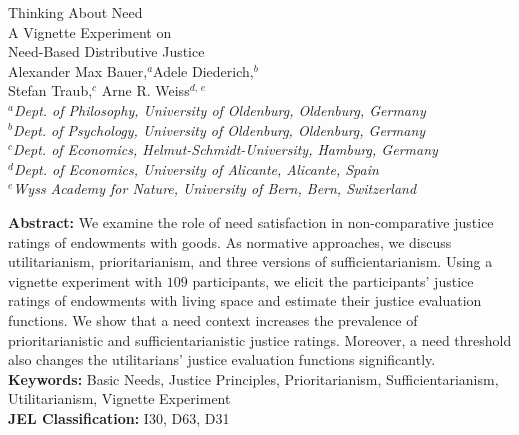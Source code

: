 \documentclass[12pt]{scrartcl}
\begin{document}
\thispagestyle{empty}
\renewcommand{\thefootnote}{\fnsymbol{footnote}}
\begin{center}
{\LARGE Thinking About Need}\\\vspace{2ex}
{\Large A Vignette Experiment on\\[1ex] Need-Based Distributive Justice}\\ \vspace{6ex}
{\large Alexander Max Bauer,$^a$\footnotemark[1] Adele Diederich,$^b$\\Stefan Traub,$^{c}$ Arne R. Weiss$^{d,\,e}$}\\ \vspace{3ex}
\textsl{\small $^{a}$Dept. of Philosophy, University of Oldenburg, Oldenburg, Germany}\\\vspace{1ex}
\textsl{\small $^{b}$Dept. of Psychology, University of Oldenburg, Oldenburg, Germany}\\\vspace{1ex}
\textsl{\small $^{c}$Dept. of Economics, Helmut-Schmidt-University, Hamburg, Germany}\\\vspace{1ex}
\textsl{\small $^{d}$Dept. of Economics, University of Alicante, Alicante, Spain}\\\vspace{1ex}
\textsl{\small $^{e}$Wyss Academy for Nature, University of Bern, Bern, Switzerland}\\\vspace{4ex}

\end{center}

\vspace{\fill}

\noindent\textbf{Abstract:} We examine the role of need satisfaction in non-comparative justice ratings of endowments with goods.
As normative approaches, we discuss utilitarianism, prioritarianism, and three versions of sufficientarianism.
Using a vignette experiment with $109$ participants, we elicit the participants' justice ratings of endowments with living space and estimate their justice evaluation functions.
We show that a need context increases the prevalence of prioritarianistic and sufficientarianistic justice ratings.
Moreover, a need threshold also changes the utilitarians' justice evaluation functions significantly.
\\[2ex]
\noindent\textbf{Keywords:} Basic Needs, Justice Principles, Prioritarianism, Sufficientarianism, Utilitarianism, Vignette Experiment\\[2ex]
\textbf{JEL Classification:} I30, D63, D31
\end{document}
